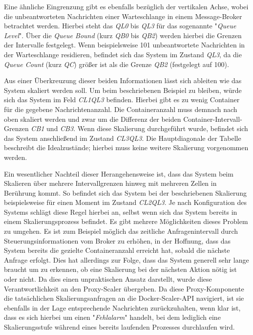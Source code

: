 Eine ähnliche Eingrenzung gibt es ebenfalls bezüglich der vertikalen Achse, wobei die unbeantworteten Nachrichten einer Warteschlange in einem Message-Broker betrachtet werden. Hierbei steht das \emph{QL0} bis \emph{QL3} für das sogenannte "\emph{Queue Level}". Über die \emph{Queue Bound} (kurz \emph{QB0} bis \emph{QB2}) werden hierbei die Grenzen der Intervalle festgelegt. Wenn beispielsweise 101 unbeantwortete Nachrichten in der Warteschlange residieren, befindet sich das System im Zustand \emph{QL3}, da die \emph{Queue Count} (kurz \emph{QC}) größer ist als die Grenze \emph{QB2} (festgelegt auf 100).

Aus einer Überkreuzung dieser beiden Informationen lässt sich ableiten wie das System skaliert werden soll. Um beim beschriebenen Beispiel zu bleiben, würde sich das System im Feld \emph{CL1QL3} befinden. Hierbei gibt es zu wenig Container für die gegebene Nachrichtenanzahl. Die Containeranzahl muss demnach nach oben skaliert werden und zwar um die Differenz der beiden Container-Intervall-Grenzen \emph{CB1} und \emph{CB3}. Wenn diese Skalierung durchgeführt wurde, befindet sich das System anschließend im Zustand \emph{CL3QL3}. Die Hauptdiagonale der Tabelle beschreibt die Idealzustände; hierbei muss keine weitere Skalierung vorgenommen werden. 

\label{prometheus:skalierungsmechanismus}
Ein wesentlicher Nachteil dieser Herangehensweise ist, dass das System beim Skalieren über mehrere Intervallgrenzen hinweg mit mehreren Zellen in Berührung kommt. So befindet sich das System bei der beschriebenen Skalierung beispielsweise für einen Moment im Zustand \emph{CL2QL3}. Je nach Konfiguration des Systems schlägt diese Regel hierbei an, selbst wenn sich das System bereits in einem Skalierungsprozess befindet. Es gibt mehrere Möglichkeiten dieses Problem zu umgehen. Es ist zum Beispiel möglich das zeitliche Anfragenintervall durch Steuerungsinformationen vom Broker zu erhöhen, in der Hoffnung, dass das System bereits die gezielte Containeranzahl erreicht hat, sobald die nächste Anfrage erfolgt. Dies hat allerdings zur Folge, dass das System generell sehr lange braucht um zu erkennen, ob eine Skalierung bei der nächsten Aktion nötig ist oder nicht. Da dies einen unpraktischen Ansatz darstellt, wurde diese Verantwortlichkeit an den Proxy-Scaler übergeben. Da diese Proxy-Komponente die tatsächlichen Skalierungsanfragen an die Docker-Scaler-API navigiert, ist sie ebenfalls in der Lage entsprechende Nachrichten zurückzuhalten, wenn klar ist, dass es sich hierbei um einen "\emph{Fehlalarm}" handelt, bei dem lediglich eine Skalierungsstufe während eines bereits laufenden Prozesses durchlaufen wird. 

